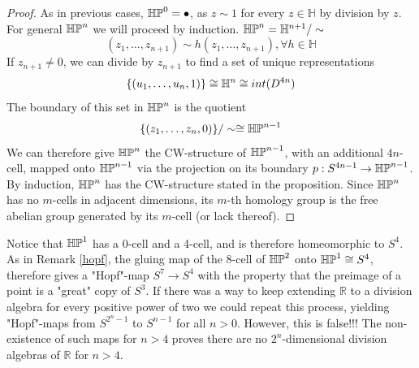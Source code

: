 \begin{proof}
As in previous cases, $\mathbb{HP}^{0}=\bullet$, as $z\sim 1$ for every $z\in \mathbb{H}$ by division by $z$. For general $\mathbb{HP}^{n}$ we will proceed by induction. $\mathbb{HP}^{n}=\mathbb{H}^{n+1}/\sim$
$$(z_1,\dots,z_{n+1})\sim h(z_1,\dots,z_{n+1}), \forall h\in \mathbb{H}$$
If $z_{n+1}\neq 0$, we can divide by $z_{n+1}$ to find a set of unique representations
$$\{(u_1,\dots,u_n,1)\}\cong \mathbb{H}^n\cong int(D^{4n})$$
The boundary of this set in $\mathbb{HP}^{n}$ is the quotient 
$$\{(z_1,\dots,z_n,0)\}/\sim \cong \mathbb{HP}^{n-1}$$
We can therefore give $\mathbb{HP}^{n}$ the CW-structure of $\mathbb{HP}^{n-1}$, with an additional $4n$-cell, mapped onto $\mathbb{HP}^{n-1}$ via the projection on its boundary $p:S^{4n-1}\rightarrow \mathbb{HP}^{n-1}$. By induction, $\mathbb{HP}^{n}$ has the CW-structure stated in the proposition. Since $\mathbb{HP}^{n}$ has no $m$-cells in adjacent dimensions, its $m$-th homology group is the free abelian group generated by its $m$-cell (or lack thereof).
\end{proof}

\begin{remark}
Notice that $\mathbb{HP}^{1}$ has a 0-cell and a 4-cell, and is therefore homeomorphic to $S^{4}$. As in Remark \ref{hopf}, the gluing map of the 8-cell of $\mathbb{HP}^{2}$ onto $\mathbb{HP}^{1}\cong S^{4}$, therefore gives a "Hopf"-map $S^7\rightarrow S^4$ with the property that the preimage of a point is a "great" copy of $S^3$. If there was a way to keep extending $\mathbb{R}$ to a division algebra for every positive power of two we could repeat this process, yielding "Hopf"-maps from $S^{2^n-1}$ to $S^{n-1}$ for all $n>0$. However, this is false!!! The non-existence of such maps for $n>4$ proves there are no $2^n$-dimensional division algebras of $\mathbb{R}$ for $n>4$.
\end{remark}